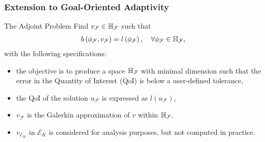 \begin{frame}
\frametitle{Extension to Goal-Oriented Adaptivity}
    \begin{block}{The Adjoint Problem}
        Find $v_{\mathcal{F}}\in \mathbb{H}_{\mathcal{F}}$ such that
  	\begin{align}
    	\label{eq:adjointH}
    	b\left(\phi_{\mathcal{F}},v_{\mathcal{F}}\right)=l\left(\phi_{\mathcal{F}}\right), \quad \forall \phi_{\mathcal{F}} \in \mathbb{H}_{\mathcal{F}},
  	\end{align}
        with the following specifications:
        \begin{itemize}
            \item the objective is to produce a space $\mathbb{H}_{\mathcal{F}}$ with minimal dimension such that the error in the Quantity of Interest (QoI) is below a user-defined tolerance,
            \item the QoI of the solution $u_{\mathcal{F}}$ is expressed as $l(u_{\mathcal{F}})$,
            \item $v_{\mathcal{F}}$ is the Galerkin approximation of $v$ within $\mathbb{H}_{\mathcal{F}}$,
            \item $v_{\mathcal{E}_K}$ in $\mathcal{E}_K$ is considered for analysis purposes, but not computed in practice.
        \end{itemize}
    \end{block}     
\end{frame}

